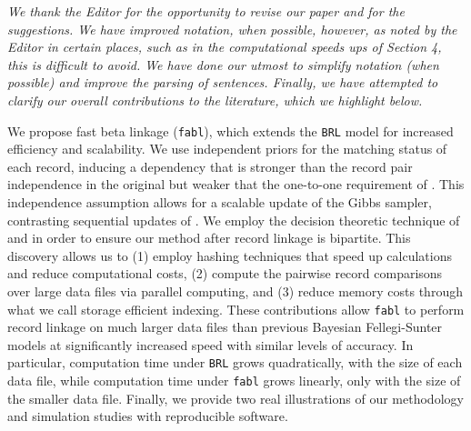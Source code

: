 \documentclass[letterpaper, parskip]{scrartcl}
\newcounter{responsectr}[section]     %
\newcommand{\reply}[1]{%
	\refstepcounter{responsectr}%
		\begin{tcolorbox}
			\itshape #1
		\end{tcolorbox}
}
\begin{document}
\reply{
We thank the Editor for the opportunity to revise our paper and for the suggestions. We have improved notation, when possible, however, as noted by the Editor in certain places, such as in the computational speeds ups of Section 4, this is difficult to avoid. We have done our utmost to simplify notation (when possible) and improve the parsing of sentences. Finally, we have attempted to clarify our overall contributions to the literature, which we highlight below. 


We propose fast beta linkage (\texttt{fabl}), which extends the \texttt{BRL} model for increased efficiency and scalability. We use independent priors for the matching status of each record, inducing a dependency that is stronger than the record pair independence in the original \cite{fellegi_theory_1969} but weaker that the one-to-one requirement of \cite{sadinle_bayesian_2017}. This independence assumption allows for a scalable update of the Gibbs sampler, contrasting sequential updates of \cite{sadinle_bayesian_2017}. We employ the decision theoretic  technique of \cite{sadinle_bayesian_2017} and \cite{steorts_bayesian_2016} in order to ensure our method after record linkage is bipartite. This discovery allows us to (1) employ hashing techniques that speed up calculations and reduce computational costs, (2) compute the pairwise record comparisons over large data files via parallel computing, and (3) reduce memory costs through what we call storage efficient indexing. These contributions allow \texttt{fabl} to perform record linkage on much larger data files than previous Bayesian Fellegi-Sunter models at significantly increased speed with similar levels of accuracy. In particular, computation time under \texttt{BRL} grows quadratically, with the size of each data file, while computation time under \texttt{fabl} grows linearly, only with the size of the smaller data file. Finally, we provide two real illustrations of our methodology and simulation studies with reproducible software. 
}
\end{document}
